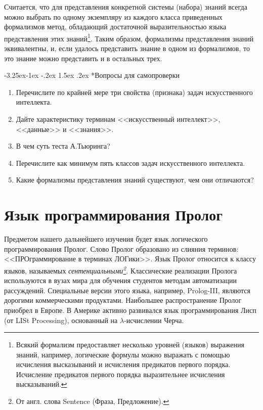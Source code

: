 \documentclass[12pt, openany, twoside]{book} %
\makeatletter
\renewcommand\subsubsection{\@startsection{subsubsection}{3}{\z@}%
                                     {-3.25ex\@plus -1ex \@minus -.2ex}%
                                     {1.5ex \@plus .2ex}%
                                     {\normalfont\normalsize\bfseries}}
\newenvironment{questions}{\subsubsection*{Вопросы для самопроверки}\begin{enumerate}}{\end{enumerate}}
\makeatother
\begin{document}
\medskip{} Считается, что для представления конкретной системы (набора) знаний всегда можно выбрать по одному экземпляру из каждого класса приведенных формализмов метод, обладающий достаточной выразительностью языка представления этих знаний\footnote{Всякий формализм предоставляет несколько уровней (языков) выражения знаний, например, логические формулы можно выражать с помощью исчисления высказываний и исчисления предикатов первого порядка. Исчисление предикатов первого порядка выразительнее исчисления высказываний.}. Таким образом, формализмы представления знаний эквивалентны, и, если удалось представить знание в одном из формализмов, то это знание можно представить и в остальных трех.

\begin{questions}
\item{} Перечислите по крайней мере три свойства (признака) задач искусственного интеллекта.
\item{} Дайте характеристику терминам <<искусственный интеллект>>, <<данные>> и <<знания>>.
\item{} В чем суть теста А.Тьюринга?
\item{} Перечислите как минимум пять классов задач искусственного интеллекта.
\item{} Какие формализмы представления знаний существуют, чем они отличаются?
\end{questions}

\chapter{Язык программирования Пролог}

Предметом нашего дальнейшего изучения будет язык логического программирования Пролог. Слово Пролог образовано из слияния терминов: <<ПРОграммирование в терминах ЛОГики>>. Язык Пролог относится к классу языков, называемых {\em сентенциальными\footnote{От англ. слова Sentence (Фраза, Предложение).}}.  Классические реализации Пролога используются в вузах мира для обучения студентов методам автоматизации рассуждений. Специальные версии этого языка, например, Prolog-III, являются дорогими коммерческими продуктами. Наибольшее распространение Пролог приобрел в Европе. В Америке активно развивался язык программирования Лисп (от LISt Processing), основанный на $\lambda$-исчислении Черча. %
\end{document}
